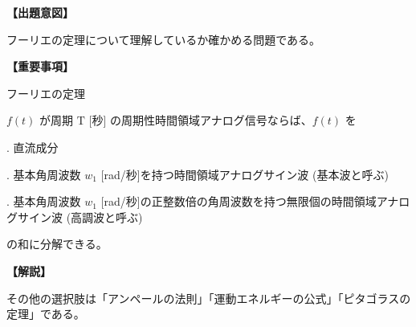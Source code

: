 \noindent \textbf{【出題意図】}

\noindent フーリエの定理について理解しているか確かめる問題である。

\vspace{1em}
\noindent \textbf{【重要事項】}

\noindent フーリエの定理

\smallskip
$f(t)$ が周期 $\textrm{T}$ [秒] の周期性時間領域アナログ信号ならば、$f(t)$ を

. 直流成分

. 基本角周波数 $w_1$ [rad/秒]を持つ時間領域アナログサイン波 (基本波と呼ぶ)

. 基本角周波数 $w_1$ [rad/秒]の正整数倍の角周波数を持つ無限個の時間領域アナログサイン波 (高調波と呼ぶ)

\smallskip
の和に分解できる。


\vspace{1em}
\noindent \textbf{【解説】}

\noindent その他の選択肢は「アンペールの法則」「運動エネルギーの公式」「ピタゴラスの定理」である。
